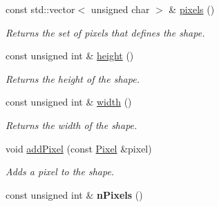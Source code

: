 \begin{CompactItemize}
const std::vector$<$ unsigned char $>$ \& \hyperlink{class_shape_7623c856a1a7916fc000f43d5efdba5b}{pixels} ()
\begin{CompactList}\small\item\em Returns the set of pixels that defines the shape. \item\end{CompactList}\item 
const unsigned int \& \hyperlink{class_shape_7a417d1fc74acae89f4d96ac36e0b73e}{height} ()
\begin{CompactList}\small\item\em Returns the height of the shape. \item\end{CompactList}\item 
const unsigned int \& \hyperlink{class_shape_aa9328cb87de52f53496b6a1eb3a60b9}{width} ()
\begin{CompactList}\small\item\em Returns the width of the shape. \item\end{CompactList}\item 
void \hyperlink{class_shape_f6114234203d9473f1fef9e6391f9243}{addPixel} (const \hyperlink{_pixel_8hpp_535e59456e3e633842529cfa8ea103c4}{Pixel} \&pixel)
\begin{CompactList}\small\item\em Adds a pixel to the shape. \item\end{CompactList}\item 
\hypertarget{class_shape_3d0e3348fdb5d2d8c9997d579c3383e2}{
const unsigned int \& \textbf{nPixels} ()}
\label{class_shape_3d0e3348fdb5d2d8c9997d579c3383e2}

\end{CompactItemize}
